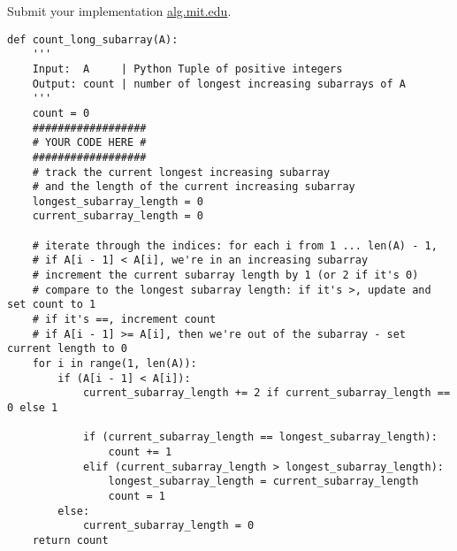 \documentclass[12pt,twoside]{article}
\begin{document}
\begin{problems}
\vfill
\problem  %
Submit your implementation {\small\url{alg.mit.edu}}.

\begin{lstlisting}
def count_long_subarray(A):
    '''
    Input:  A     | Python Tuple of positive integers
    Output: count | number of longest increasing subarrays of A
    '''
    count = 0
    ##################
    # YOUR CODE HERE #
    ##################
    # track the current longest increasing subarray
    # and the length of the current increasing subarray
    longest_subarray_length = 0
    current_subarray_length = 0

    # iterate through the indices: for each i from 1 ... len(A) - 1,
    # if A[i - 1] < A[i], we're in an increasing subarray
    # increment the current subarray length by 1 (or 2 if it's 0)
    # compare to the longest subarray length: if it's >, update and set count to 1
    # if it's ==, increment count
    # if A[i - 1] >= A[i], then we're out of the subarray - set current length to 0
    for i in range(1, len(A)):
        if (A[i - 1] < A[i]):
            current_subarray_length += 2 if current_subarray_length == 0 else 1

            if (current_subarray_length == longest_subarray_length):
                count += 1
            elif (current_subarray_length > longest_subarray_length):
                longest_subarray_length = current_subarray_length
                count = 1
        else:
            current_subarray_length = 0
    return count
\end{lstlisting}

\end{problems}
\end{document}
